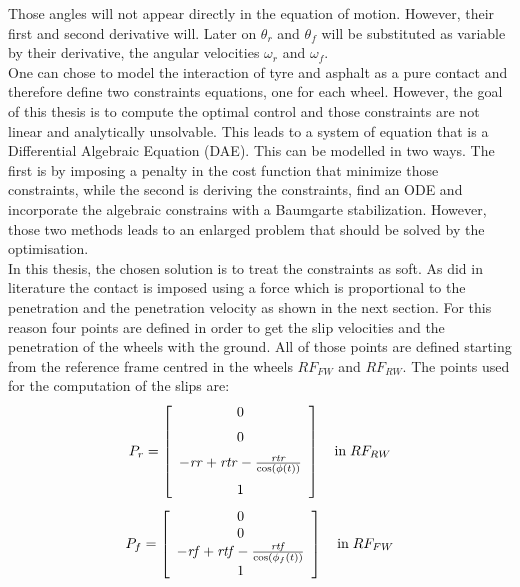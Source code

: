 %
Those angles will not appear directly in the equation of motion. However, their first and second derivative will. Later on $\theta_r$ and $\theta_f$ will be substituted as variable by their derivative, the angular velocities $\omega_r$ and $\omega_f$.\\
One can chose to model the interaction of tyre and asphalt as a pure contact and therefore define two constraints equations, one for each wheel. However, the goal of this thesis is to compute the optimal control and those constraints are not linear and analytically unsolvable. This leads to a system of equation that is a Differential Algebraic Equation (DAE). This can be modelled in two ways. The first is by imposing a penalty in the cost function that minimize those constraints, while the second is deriving the constraints, find an ODE and incorporate the algebraic constrains with a Baumgarte stabilization\cite{baumgarte1972stabilization}. However, those two methods leads to an enlarged problem that should be solved by the optimisation. \\
In this thesis, the chosen solution is to treat the constraints as soft. As did in literature \cite{leonelli2019optimal} the contact is imposed using a force which is proportional to the penetration and the penetration velocity as shown in the next section. For this reason four points are defined in order to get the slip velocities and the penetration of the wheels with the ground. All of those points are defined starting from the reference frame centred in the wheels $RF_{FW}$ and $RF_{RW}$.
The points used for the computation of the slips are:
%
\begin{equation}
P_r =   \left[ \begin {array}{c} 0\\ \noalign{\medskip}0\\ \noalign{\medskip}
-{\it rr}+{\it rtr}-{\frac {{\it rtr}}{\cos \left( \phi \left( t
 \right)  \right) }}\\ \noalign{\medskip}1\end {array} \right] 
\quad \text{in} \; RF_{RW}
\end{equation}
%
\begin{equation}
P_f =   
\left[ \begin{array}{c} 
0\\
0\\ 
-{\it rf}+{\it rtf}-{\frac {{\it rtf}}{\cos \left( \phi_{f} \left( t
 \right)  \right) }}\\
1
\end{array} \right]
\quad \text{in} \; RF_{FW}
\end{equation}
